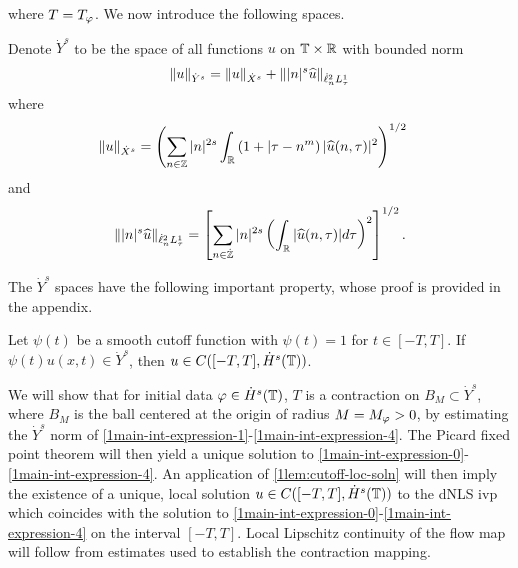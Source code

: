 %
%
where $T = T_{\varphi}$. We now introduce the following spaces. 
%
\begin{definition}
	Denote $\dot{Y}^s$ to be the space of all
	functions $u$ on $\mathbb{T} \times \mathbb{R}$ with
	bounded norm
\begin{equation}
	\label{1Y-s-norm}
	\begin{split}
		\|u\|_{\dot{Y}^s} = \|u\|_{\dot{X}^s} + \||n|^s \widehat{ u}\|_{ \dot{\ell}^2_n L^1_\tau }
	\end{split}
\end{equation}
%
%
%
%
where
%
\begin{equation}
	\label{1X^s-norm}
	\begin{split}
		& \|u\|_{\dot{X}^s}
		= \left ( \sum_{n\in \mathbb{Z}} |n|^{2s} \int_{\mathbb{R}} \left ( 1 + | 
		\tau - n^m \right ) | \widehat{u} ( n, \tau ) |^2
		\right )^{1/2}
	\end{split}
\end{equation}
and
%
%
\begin{equation}
	\label{1E-norm}
	\| | n |^{s} \widehat{u}\|_{ \dot{\ell}^2_n L^1_\tau } = \left[ \sum_{n \in \dot{\mathbb{Z}}}| n |^{2s} \left(
	\int_{\mathbb{R}}| \widehat{u}(n, \tau) |d \tau \right)^{2} \right]^{1/2}.
\end{equation}
%
%
%
%
\end{definition}
The $\dot{Y}^s$ spaces have the following important property, whose proof
is provided in the appendix.
\begin{lemma}
	\label{1lem:cutoff-loc-soln}
	Let $\psi(t)$ be a smooth cutoff function with $\psi(t) =1$ for $t \in [-T, T]$. If
	$\psi(t)u(x,t) \in \dot{Y}^s$, then $u \in C([-T, T], \dot{H}^s(\mathbb{T}))$.
\end{lemma}
%
%
We will 
show that for initial data $\varphi \in \dot{H}^s(\mathbb{T})$, $T$ is a contraction on $B_M 
\subset \dot{Y}^s$, where $B_M$ is the ball centered at the origin of radius $M = 
M_{\varphi}> 0$, by estimating the $\dot{Y}^s$
norm of \eqref{1main-int-expression-1}-\eqref{1main-int-expression-4}. The 
Picard fixed point theorem will
then yield a unique solution to
\eqref{1main-int-expression-0}-\eqref{1main-int-expression-4}. An application of
\cref{1lem:cutoff-loc-soln} will then imply the existence of a unique, local
solution $u \in C([-T, T], \dot{H}^s(\mathbb{T}))$ to the dNLS ivp which coincides with the solution to
\eqref{1main-int-expression-0}-\eqref{1main-int-expression-4} on the interval $[-T, T]$. Local Lipschitz continuity of the flow map will follow
from estimates used to establish the contraction mapping. %
%
%
%
%
%
%
%
